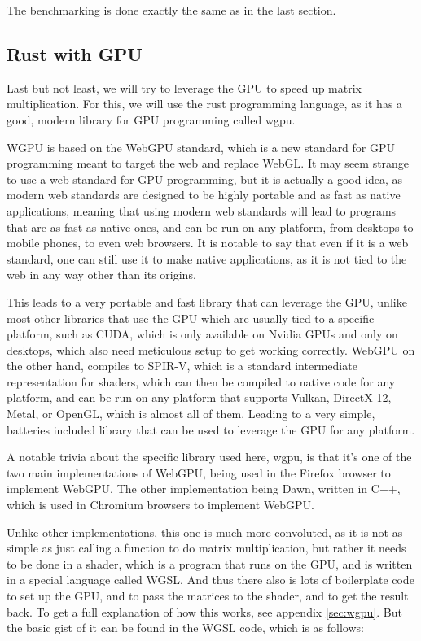 \documentclass{article}
\begin{document}
The benchmarking is done exactly the same as in the last section.

\subsection{Rust with GPU}

Last but not least, we will try to leverage the GPU to speed up matrix multiplication.
For this, we will use the rust programming language, as it has a good, modern library for GPU programming called wgpu.

WGPU is based on the WebGPU standard, which is a new standard for GPU programming meant to target the web and replace WebGL.
It may seem strange to use a web standard for GPU programming, but it is actually a good idea, as modern web standards are designed to be
highly portable and as fast as native applications, meaning that using modern web standards will lead to programs that are as fast as native ones,
and can be run on any platform, from desktops to mobile phones, to even web browsers.
It is notable to say that even if it is a web standard, one can still use it to make native applications, as it is not tied to the web in any way
other than its origins.

This leads to a very portable and fast library that can leverage the GPU, unlike most other libraries that use the GPU which
are usually tied to a specific platform, such as CUDA, which is only available on Nvidia GPUs and only on desktops, which also need meticulous setup
to get working correctly. WebGPU on the other hand, compiles to SPIR-V, which is a standard intermediate representation for shaders, which can then be
compiled to native code for any platform, and can be run on any platform that supports Vulkan, DirectX 12, Metal, or OpenGL, which is almost all of them.
Leading to a very simple, batteries included library that can be used to leverage the GPU for any platform.

A notable trivia about the specific library used here, wgpu, is that it's one of the two main implementations of WebGPU, being used in the Firefox browser to implement WebGPU.
The other implementation being Dawn, written in C++, which is used in Chromium browsers to implement WebGPU.

Unlike other implementations, this one is much more convoluted, as it is not as simple as just calling a function to do matrix multiplication,
but rather it needs to be done in a shader, which is a program that runs on the GPU, and is written in a special language called WGSL.
And thus there also is lots of boilerplate code to set up the GPU, and to pass the matrices to the shader, and to get the result back.
To get a full explanation of how this works, see appendix \ref{sec:wgpu}.
But the basic gist of it can be found in the WGSL code, which is as follows:
\end{document}
